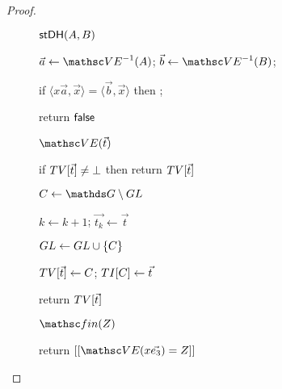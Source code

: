 \begin{proof}
\begin{figure}[tp]
\begin{minipage}[t]{0.49\textwidth}
		\ExptSepSpace
		
		\begin{oracle}{$\mathsf{stDH}(A,B)$}
			\item $\vec{a} \gets \VE^{-1}(A)$; $\vec{b} \gets \VE^{-1}(B)$; 
			\item {}
			\item if $\langle x \vec{a},\vec{x} \rangle = \langle \vec{b}, \vec{x} \rangle$ then \gamechange{$\bad[2] \gets \true$}{}; 
			\item return $\mathsf{false}$
		\end{oracle}
		
		\ExptSepSpace
		\begin{algorithm}{$\VE(\vec{t})$}
			\item if $TV[\vec{t}] \neq \bot$ then return $TV[\vec{t}]$
			\item $C \gets \group \setminus \GL$
			\item $k \gets k+1$; $\vec{t_k} \gets \vec{t}$
			\item $GL \gets GL \cup \{C\}$
			\item  $TV[\vec{t}] \gets C$; $TI[C] \gets \vec{t}$
			\item return $TV[\vec{t}]$
		\end{algorithm}
		
		\ExptSepSpace
		\begin{oracle}{$\Finalize(Z)$}
			\item {}
			\item \quad {}
			\item return $[[\VE(x \vec{e_3}) = Z]]$ 
		\end{oracle}
	\end{minipage}
	\begin{minipage}[t]{0.49\textwidth}
		

\end{minipage}
\end{figure}
\end{proof}
